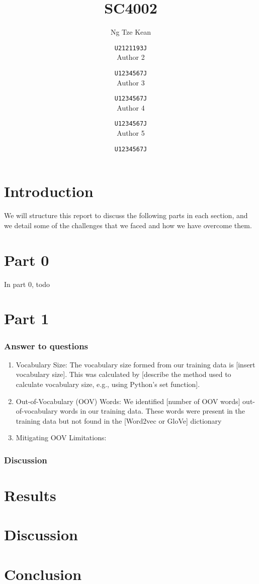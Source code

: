 \documentclass{article}
\title{SC4002}
\author{
  Ng Tze Kean \and
  \texttt{U2121193J} \\
  Author 2 \and
  \texttt{U1234567J} \\
  Author 3 \and
  \texttt{U1234567J} \\
  Author 4 \and
  \texttt{U1234567J} \\
  Author 5 \and
  \texttt{U1234567J}
}
\begin{document}
\maketitle

\section{Introduction}
We will structure this report to discuss the following parts in each section,
and we detail some of the challenges that we faced and how we have overcome
them.

\section{Part 0}
In part 0, todo

\section{Part 1}

\subsubsection{Answer to questions}

\begin{enumerate}
  \item Vocabulary Size: The vocabulary size formed from our training data is [insert
            vocabulary size]. This was calculated by [describe the method used to calculate
            vocabulary size, e.g., using Python's set function].

  \item Out-of-Vocabulary (OOV) Words: We identified [number of OOV words]
        out-of-vocabulary words in our training data. These words were present in the
        training data but not found in the [Word2vec or GloVe] dictionary

  \item Mitigating OOV Limitations:
\end{enumerate}

\subsubsection{Discussion}

\section{Results}

\section{Discussion}

\section{Conclusion}
\end{document}
